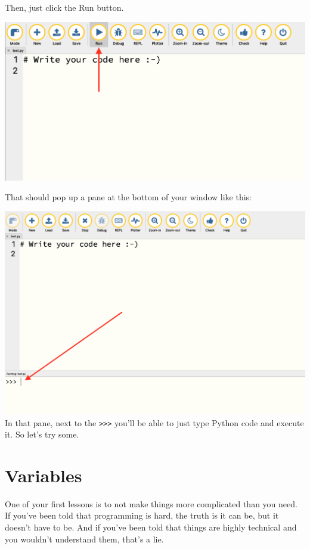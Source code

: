 \documentclass[
]{book}
\begin{document}
Then, just click the Run button.

\includegraphics[width=1\linewidth]{images/02image2}

That should pop up a pane at the bottom of your window like this:

\includegraphics[width=1\linewidth]{images/02image3}
In that pane, next to the \texttt{\textgreater{}\textgreater{}\textgreater{}} you'll be able to just type Python code and execute it. So let's try some.

\hypertarget{variables}{%
\section{Variables}\label{variables}}

One of your first lessons is to not make things more complicated than you need. If you've been told that programming is hard, the truth is it can be, but it doesn't have to be. And if you've been told that things are highly technical and you wouldn't understand them, that's a lie.
\end{document}
